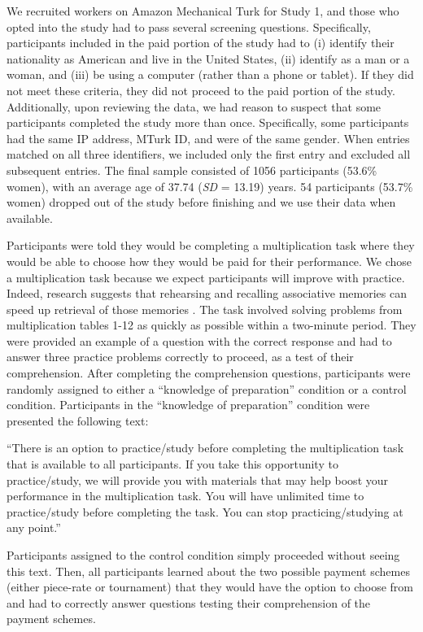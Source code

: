 \documentclass[a4paper, nobind]{templates/ociamthesis}
\begin{document}
We recruited workers on Amazon Mechanical Turk for Study 1, and those who opted into the study had to pass several screening questions. Specifically, participants included in the paid portion of the study had to (i) identify their nationality as American and live in the United States, (ii) identify as a man or a woman, and (iii) be using a computer (rather than a phone or tablet). If they did not meet these criteria, they did not proceed to the paid portion of the study. Additionally, upon reviewing the data, we had reason to suspect that some participants completed the study more than once. Specifically, some participants had the same IP address, MTurk ID, and were of the same gender. When entries matched on all three identifiers, we included only the first entry and excluded all subsequent entries. The final sample consisted of 1056 participants (53.6\% women), with an average age of 37.74 (\emph{SD} = 13.19) years. 54 participants (53.7\% women) dropped out of the study before finishing and we use their data when available.

Participants were told they would be completing a multiplication task where they would be able to choose how they would be paid for their performance. We chose a multiplication task because we expect participants will improve with practice. Indeed, research suggests that rehearsing and recalling associative memories can speed up retrieval of those memories \autocite{Rundus1971}. The task involved solving problems from multiplication tables 1-12 as quickly as possible within a two-minute period. They were provided an example of a question with the correct response and had to answer three practice problems correctly to proceed, as a test of their comprehension. After completing the comprehension questions, participants were randomly assigned to either a ``knowledge of preparation'' condition or a control condition. Participants in the ``knowledge of preparation'' condition were presented the following text:

``There is an option to practice/study before completing the multiplication task that is available to all participants. If you take this opportunity to practice/study, we will provide you with materials that may help boost your performance in the multiplication task. You will have unlimited time to practice/study before completing the task. You can stop practicing/studying at any point.''

Participants assigned to the control condition simply proceeded without seeing this text. Then, all participants learned about the two possible payment schemes (either piece-rate or tournament) that they would have the option to choose from and had to correctly answer questions testing their comprehension of the payment schemes.
\end{document}
